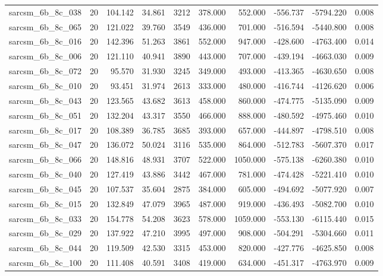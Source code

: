 \begin{tabular}{lrrrrrrrrr}
sarcsm\_6b\_8c\_038 & 20 & 104.142 & 34.861 & 3212 & 378.000 & 552.000 & -556.737 & -5794.220 & 0.008 \\
sarcsm\_6b\_8c\_065 & 20 & 121.022 & 39.760 & 3549 & 436.000 & 701.000 & -516.594 & -5440.800 & 0.008 \\
sarcsm\_6b\_8c\_016 & 20 & 142.396 & 51.263 & 3861 & 552.000 & 947.000 & -428.600 & -4763.400 & 0.014 \\
sarcsm\_6b\_8c\_006 & 20 & 121.110 & 40.941 & 3890 & 443.000 & 707.000 & -439.194 & -4663.030 & 0.009 \\
sarcsm\_6b\_8c\_072 & 20 & 95.570 & 31.930 & 3245 & 349.000 & 493.000 & -413.365 & -4630.650 & 0.008 \\
sarcsm\_6b\_8c\_010 & 20 & 93.451 & 31.974 & 2613 & 333.000 & 480.000 & -416.744 & -4126.620 & 0.006 \\
sarcsm\_6b\_8c\_043 & 20 & 123.565 & 43.682 & 3613 & 458.000 & 860.000 & -474.775 & -5135.090 & 0.009 \\
sarcsm\_6b\_8c\_051 & 20 & 132.204 & 43.317 & 3550 & 466.000 & 888.000 & -480.592 & -4975.460 & 0.010 \\
sarcsm\_6b\_8c\_017 & 20 & 108.389 & 36.785 & 3685 & 393.000 & 657.000 & -444.897 & -4798.510 & 0.008 \\
sarcsm\_6b\_8c\_047 & 20 & 136.072 & 50.024 & 3116 & 535.000 & 864.000 & -512.783 & -5607.370 & 0.017 \\
sarcsm\_6b\_8c\_066 & 20 & 148.816 & 48.931 & 3707 & 522.000 & 1050.000 & -575.138 & -6260.380 & 0.010 \\
sarcsm\_6b\_8c\_040 & 20 & 127.419 & 43.886 & 3442 & 467.000 & 781.000 & -474.428 & -5221.410 & 0.010 \\
sarcsm\_6b\_8c\_045 & 20 & 107.537 & 35.604 & 2875 & 384.000 & 605.000 & -494.692 & -5077.920 & 0.007 \\
sarcsm\_6b\_8c\_015 & 20 & 132.849 & 47.079 & 3965 & 487.000 & 919.000 & -436.493 & -5082.700 & 0.010 \\
sarcsm\_6b\_8c\_033 & 20 & 154.778 & 54.208 & 3623 & 578.000 & 1059.000 & -553.130 & -6115.440 & 0.015 \\
sarcsm\_6b\_8c\_029 & 20 & 137.922 & 47.210 & 3995 & 497.000 & 908.000 & -504.291 & -5304.660 & 0.011 \\
sarcsm\_6b\_8c\_044 & 20 & 119.509 & 42.530 & 3315 & 453.000 & 820.000 & -427.776 & -4625.850 & 0.008 \\
sarcsm\_6b\_8c\_100 & 20 & 111.408 & 40.591 & 3408 & 419.000 & 634.000 & -451.317 & -4763.970 & 0.009 \\

\end{tabular}
